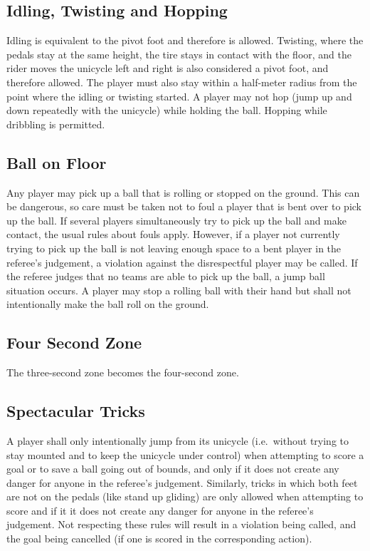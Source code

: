 \subsection{Idling, Twisting and Hopping}

Idling is equivalent to the pivot foot and therefore is allowed.
Twisting, where the pedals stay at the same height, the tire stays in contact with the floor, and the rider moves the unicycle left and right is also considered a pivot foot, and therefore allowed.
The player must also stay within a half-meter radius from the point where the idling or twisting started.
A player may not hop (jump up and down repeatedly with the unicycle) while holding the ball.
Hopping while dribbling is permitted.

\subsection{Ball on Floor}
Any player may pick up a ball that is rolling or stopped on the ground.
This can be dangerous, so care must be taken not to foul a player that is bent over to pick up the ball.
If several players simultaneously try to pick up the ball and make contact, the usual rules about fouls apply.
However, if a player not currently trying to pick up the ball is not leaving enough space to a bent player in the referee's judgement, a violation against the disrespectful player may be called.
If the referee judges that no teams are able to pick up the ball, a jump ball situation occurs.
A player may stop a rolling ball with their hand but shall not intentionally make the ball roll on the ground.

\subsection{Four Second Zone}
The three-second zone becomes the four-second zone.

\subsection{Spectacular Tricks}
A player shall only intentionally jump from its unicycle (i.e.\ without trying to stay mounted and to keep the unicycle under control) when attempting to score a goal or to save a ball going out of bounds, and only if it does not create any danger for anyone in the referee's judgement.
Similarly, tricks in which both feet are not on the pedals (like stand up gliding) are only allowed when attempting to score and if it it does not create any danger for anyone in the referee's judgement.
Not respecting these rules will result in a violation being called, and the goal being cancelled (if one is scored in the corresponding action).

